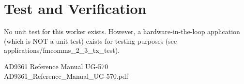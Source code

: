 \documentclass{article}
\begin{document}
\section*{Test and Verification}
No unit test for this worker exists. However, a hardware-in-the-loop application (which is NOT a unit test) exists for testing purposes (see applications/fmcomms\_2\_3\_tx\_test).

 \begin{thebibliography}{1}


  AD9361 Reference Manual UG-570\\
 AD9361\_Reference\_Manual\_UG-570.pdf
 \end{thebibliography}
\end{document}
